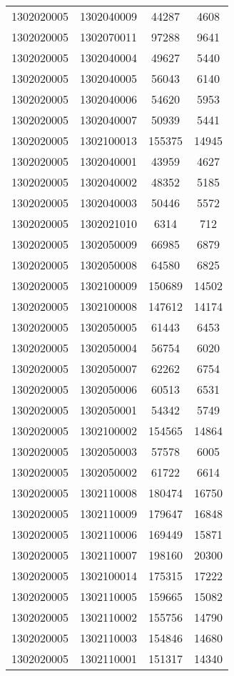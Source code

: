 \begin{longtable}{llcc}
1302020005 & 1302040009 & 44287 & 4608\\
1302020005 & 1302070011 & 97288 & 9641\\
1302020005 & 1302040004 & 49627 & 5440\\
1302020005 & 1302040005 & 56043 & 6140\\
1302020005 & 1302040006 & 54620 & 5953\\
1302020005 & 1302040007 & 50939 & 5441\\
1302020005 & 1302100013 & 155375 & 14945\\
1302020005 & 1302040001 & 43959 & 4627\\
1302020005 & 1302040002 & 48352 & 5185\\
1302020005 & 1302040003 & 50446 & 5572\\
1302020005 & 1302021010 & 6314 & 712\\
1302020005 & 1302050009 & 66985 & 6879\\
1302020005 & 1302050008 & 64580 & 6825\\
1302020005 & 1302100009 & 150689 & 14502\\
1302020005 & 1302100008 & 147612 & 14174\\
1302020005 & 1302050005 & 61443 & 6453\\
1302020005 & 1302050004 & 56754 & 6020\\
1302020005 & 1302050007 & 62262 & 6754\\
1302020005 & 1302050006 & 60513 & 6531\\
1302020005 & 1302050001 & 54342 & 5749\\
1302020005 & 1302100002 & 154565 & 14864\\
1302020005 & 1302050003 & 57578 & 6005\\
1302020005 & 1302050002 & 61722 & 6614\\
1302020005 & 1302110008 & 180474 & 16750\\
1302020005 & 1302110009 & 179647 & 16848\\
1302020005 & 1302110006 & 169449 & 15871\\
1302020005 & 1302110007 & 198160 & 20300\\
1302020005 & 1302100014 & 175315 & 17222\\
1302020005 & 1302110005 & 159665 & 15082\\
1302020005 & 1302110002 & 155756 & 14790\\
1302020005 & 1302110003 & 154846 & 14680\\
1302020005 & 1302110001 & 151317 & 14340\\

\end{longtable}
